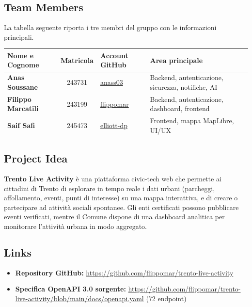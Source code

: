 \documentclass[11pt,a4paper]{article}
\begin{document}
  \subsection{Team Members}
  La tabella seguente riporta i tre membri del gruppo con le informazioni principali.
  \begin{center}
  \begin{small}
  \begin{tabular}{>{\bfseries}l c l l}
  \toprule
  \rowcolor{headerBg}\color{white}\textbf{Nome e Cognome} & \color{white}\textbf{Matricola} &
  \color{white}\textbf{Account GitHub} & \color{white}\textbf{Area principale} \\
  \midrule
  Anas Soussane     & 243731 & \href{https://github.com/anass03}{anass03}       & Backend, autenticazione, sicurezza, notifiche, AI \\
  Filippo Marcatili & 243199 & \href{https://github.com/flippomar}{flippomar}   & Backend, autenticazione, dashboard, frontend \\
  Saif Safi         & 245473 & \href{https://github.com/elliott-dp}{elliott-dp} & Frontend, mappa MapLibre, UI/UX \\
  \bottomrule
  \end{tabular}
  \end{small}
  \end{center}

  \subsection{Project Idea}
  \textbf{Trento Live Activity} \`{e} una piattaforma civic-tech web che permette ai cittadini
  di Trento di esplorare in tempo reale i dati urbani (parcheggi, affollamento, eventi, punti di
  interesse) su una mappa interattiva, e di creare o partecipare ad attivit\`{a} sociali
  spontanee. Gli enti certificati possono pubblicare eventi verificati, mentre il Comune dispone
  di una dashboard analitica per monitorare l'attivit\`{a} urbana in modo aggregato.

  \subsection{Links}
  \begin{itemize}
    \item \textbf{Repository GitHub:} \url{https://github.com/flippomar/trento-live-activity}
    \item \textbf{Specifica OpenAPI 3.0 sorgente:} \url{https://github.com/flippomar/trento-live-activity/blob/main/docs/openapi.yaml} (72 endpoint)
  \end{itemize}
\end{document}
